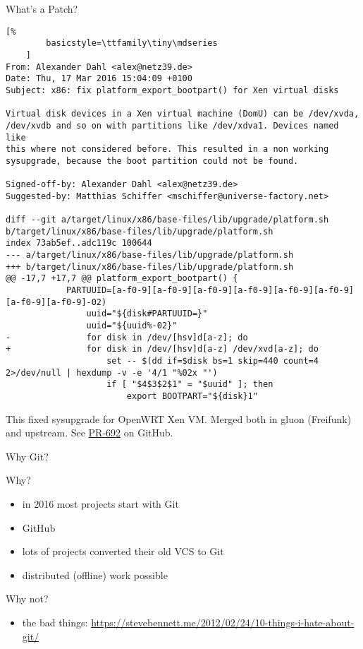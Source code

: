 \documentclass{beamer}
\begin{document}
\begin{frame}[fragile]{What's a Patch?}
    \begin{lstlisting}[%
        basicstyle=\ttfamily\tiny\mdseries
    ]
From: Alexander Dahl <alex@netz39.de>
Date: Thu, 17 Mar 2016 15:04:09 +0100
Subject: x86: fix platform_export_bootpart() for Xen virtual disks

Virtual disk devices in a Xen virtual machine (DomU) can be /dev/xvda,
/dev/xvdb and so on with partitions like /dev/xdva1. Devices named like
this where not considered before. This resulted in a non working
sysupgrade, because the boot partition could not be found.

Signed-off-by: Alexander Dahl <alex@netz39.de>
Suggested-by: Matthias Schiffer <mschiffer@universe-factory.net>

diff --git a/target/linux/x86/base-files/lib/upgrade/platform.sh b/target/linux/x86/base-files/lib/upgrade/platform.sh
index 73ab5ef..adc119c 100644
--- a/target/linux/x86/base-files/lib/upgrade/platform.sh
+++ b/target/linux/x86/base-files/lib/upgrade/platform.sh
@@ -17,7 +17,7 @@ platform_export_bootpart() {
            PARTUUID=[a-f0-9][a-f0-9][a-f0-9][a-f0-9][a-f0-9][a-f0-9][a-f0-9][a-f0-9]-02)
                uuid="${disk#PARTUUID=}"
                uuid="${uuid%-02}"
-               for disk in /dev/[hsv]d[a-z]; do
+               for disk in /dev/[hsv]d[a-z] /dev/xvd[a-z]; do
                    set -- $(dd if=$disk bs=1 skip=440 count=4 2>/dev/null | hexdump -v -e '4/1 "%02x "')
                    if [ "$4$3$2$1" = "$uuid" ]; then
                        export BOOTPART="${disk}1"
    \end{lstlisting}
    \pause
    This fixed sysupgrade for OpenWRT Xen VM. Merged both in gluon
    (Freifunk) and upstream.
    See \href{https://github.com/freifunk-gluon/gluon/pull/692}{PR-692} on GitHub.
\end{frame}

\begin{frame}{Why Git?}
    \begin{exampleblock}{Why?}
        \begin{itemize}
            \item in 2016 most projects start with Git
            \item GitHub
            \item lots of projects converted their old VCS to Git
            \item distributed (offline) work possible
        \end{itemize}
    \end{exampleblock}
    \pause
    \begin{alertblock}{Why not?}
        \begin{itemize}
            \item the bad things: \url{https://stevebennett.me/2012/02/24/10-things-i-hate-about-git/}
        \end{itemize}
    \end{alertblock}
\end{frame}
\end{document}
